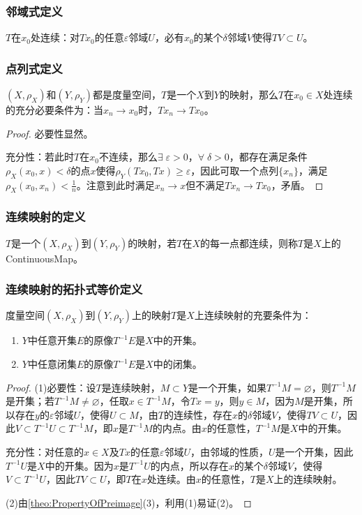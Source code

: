 \subsubsection{邻域式定义}
\begin{definition}
	$T$在$x_0$处连续：对$Tx_0$的任意$\varepsilon$邻域$U$，必有$x_0$的某个$\delta$邻域$V$使得$TV\subset U$。
\end{definition}
\subsubsection{点列式定义}
\begin{theorem}
	$(X,\rho_X)$和$(Y,\rho_Y)$都是度量空间，$T$是一个$X$到$Y$的映射，那么$T$在$x_0\in X$处连续的充分必要条件为：当$x_n\to x_0$时，$Tx_n\to Tx_0$。
\end{theorem}
\begin{proof}
	必要性显然。\par
	充分性：若此时$T$在$x_0$不连续，那么$\exists\;\varepsilon>0$，$\forall\;\delta>0$，都存在满足条件$\rho_X(x_0,x)<\delta$的点$x$使得$\rho_Y(Tx_0,Tx)\geqslant\varepsilon$，因此可取一个点列$\{x_n\}$，满足$\rho_X(x_0,x_n)<\frac{1}{n}$。注意到此时满足$x_n\to x$但不满足$Tx_n\to Tx_0$，矛盾。
\end{proof}
\subsubsection{连续映射的定义}
\begin{definition}
	$T$是一个$(X,\rho_X)$到$(Y,\rho_Y)$的映射，若$T$在$X$的每一点都连续，则称$T$是$X$上的\gls{ContinuousMap}。
\end{definition}
\subsubsection{连续映射的拓扑式等价定义}
\begin{theorem}\label{theo:ContinousMapO2OC2C}
	度量空间$(X,\rho_X)$到$(Y,\rho_Y)$上的映射$T$是$X$上连续映射的充要条件为：
	\begin{enumerate}
		\item $Y$中任意开集$E$的原像$T^{-1}E$是$X$中的开集。
		\item $Y$中任意闭集$E$的原像$T^{-1}E$是$X$中的闭集。
	\end{enumerate}
\end{theorem}
\begin{proof}
	(1)必要性：设$T$是连续映射，$M\subset Y$是一个开集，如果$T^{-1}M=\varnothing$，则$T^{-1}M$是开集；若$T^{-1}M\ne\varnothing$，任取$x\in T^{-1}M$，令$Tx=y$，则$y\in M$，因为$M$是开集，所以存在$y$的$\varepsilon$邻域$U$，使得$U\subset M$，由$T$的连续性，存在$x$的$\delta$邻域$V$，使得$TV\subset U$，因此$V\subset T^{-1}U\subset T^{-1}M$，即$x$是$T^{-1}M$的内点。由$x$的任意性，$T^{-1}M$是$X$中的开集。\par
	充分性：对任意的$x\in X$及$Tx$的任意$\varepsilon$邻域$U$，由邻域的性质，$U$是一个开集，因此$T^{-1}U$是$X$中的开集。因为$x$是$T^{-1}U$的内点，所以存在$x$的某个$\delta$邻域$V$，使得$V\subset T^{-1}U$，因此$TV\subset U$，即$T$在$x$处连续。由$x$的任意性，$T$是$X$上的连续映射。\par
	(2)由\cref{theo:PropertyOfPreimage}(3)，利用(1)易证(2)。
\end{proof}
